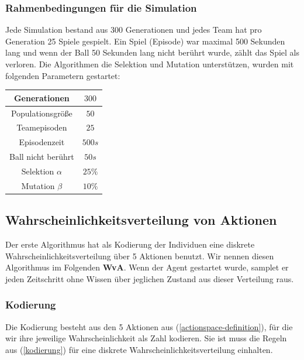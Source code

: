         \subsubsection*{Rahmenbedingungen für die Simulation}
        Jede Simulation bestand aus 300 Generationen und jedes Team hat pro Generation 25 Spiele gespielt. Ein Spiel (Episode) war maximal 500 Sekunden lang und wenn der Ball 50 Sekunden lang nicht berührt wurde, zählt das Spiel als verloren. Die Algorithmen die Selektion und Mutation unterstützen, wurden mit folgenden Parametern gestartet:
        \hfill \\
        \begin{center}
            \begin{tabular}{ |c|c| } 
                \hline
                Generationen       & $300$  \\ \hline
                Populationsgröße   & $50$   \\ \hline
                Teamepisoden       & $25$   \\ \hline
                Episodenzeit       & $500s$ \\ \hline
                Ball nicht berührt & $50s$  \\ \hline
                Selektion $\alpha$ & $25\%$ \\ \hline
                Mutation $\beta$   & $10\%$ \\ \hline
            \end{tabular}
        \end{center}

\newpage

        \subsection{Wahrscheinlichkeitsverteilung von Aktionen} \label{actiondist-definition}

            Der erste Algorithmus hat als Kodierung der Individuen eine diskrete Wahrscheinlichkeitsverteilung über 5 Aktionen benutzt. Wir nennen diesen Algorithmus im Folgenden \textbf{WvA}. Wenn der Agent gestartet wurde, samplet er jeden Zeitschritt ohne Wissen über jeglichen Zustand aus dieser Verteilung raus. 

            \subsubsection*{Kodierung}
            Die Kodierung besteht aus den 5 Aktionen aus (\ref{actionspace-definition}), für die wir ihre jeweilige Wahrscheinlichkeit als Zahl kodieren. Sie ist muss die Regeln aus (\ref{kodierung}) für eine diskrete Wahrscheinlichkeitsverteilung einhalten.

